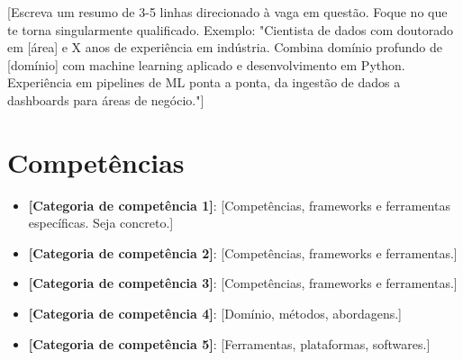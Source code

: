\documentclass[11pt,a4paper,sans]{moderncv}
\begin{document}
\makecvtitle


\vspace{6pt}
\small{[Escreva um resumo de 3-5 linhas direcionado à vaga em questão. Foque no que te torna singularmente qualificado. Exemplo: "Cientista de dados com doutorado em [área] e X anos de experiência em indústria. Combina domínio profundo de [domínio] com machine learning aplicado e desenvolvimento em Python. Experiência em pipelines de ML ponta a ponta, da ingestão de dados a dashboards para áreas de negócio."]}


\section{Competências}
\vspace{1pt}
\begin{itemize}

\item \textbf{[Categoria de competência 1]}: [Competências, frameworks e ferramentas específicas. Seja concreto.]

\item \textbf{[Categoria de competência 2]}: [Competências, frameworks e ferramentas.]

\item \textbf{[Categoria de competência 3]}: [Competências, frameworks e ferramentas.]

\item \textbf{[Categoria de competência 4]}: [Domínio, métodos, abordagens.]

\item \textbf{[Categoria de competência 5]}: [Ferramentas, plataformas, softwares.]

\end{itemize}

\end{document}
